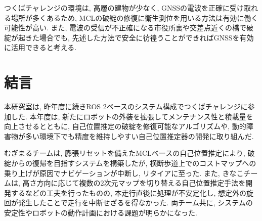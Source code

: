 \documentclass[twocolumn,9pt]{jsproceedings}
\begin{document}
つくばチャレンジの環境は, 高層の建物が少なく, 
GNSSの電波を正確に受け取れる場所が多くあるため, 
MCLの破綻の修復に衛生測位を用いる方法は有効に働く可能性が高い. 
また, 電波の受信が不正確になる市役所裏や交差点近くの橋で破綻が起きた場合でも, 
先述した方法で安全に彷徨うことができればGNSSを有効に活用できると考える. 








\section{結言}
本研究室は, 昨年度に続きROS 2ベースのシステム構成でつくばチャレンジに参加した. 
本年度は, 新たにロボットの外装を拡張してメンテナンス性と積載量を向上させるとともに, 
自己位置推定の破綻を修復可能なアルゴリズムや, 
動的障害物が多い環境下でも精度を維持しやすい自己位置推定器の開発に取り組んだ. 

むぎまるチームは, 
膨張リセットを備えたMCLベースの自己位置推定により, 
破綻からの復帰を目指すシステムを構築したが, 
横断歩道上でのコストマップへの乗り上げが原因でナビゲーションが中断し, 
リタイアに至った. 
また, きなこチームは, 
高さ方向に応じて複数の2次元マップを切り替える自己位置推定手法を開発するなどの工夫を行ったものの, 
本走行直後に処理が不安定化し, 
想定外の旋回が発生したことで走行を中断せざるを得なかった. 
両チーム共に, システムの安定性やロボットの動作計画における課題が明らかになった.
\end{document}
